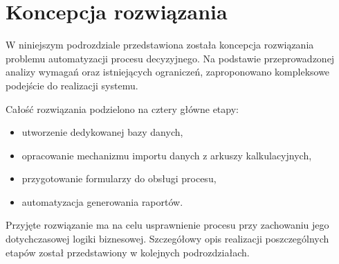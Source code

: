 \section{Koncepcja rozwiązania}
W niniejszym podrozdziale przedstawiona została koncepcja rozwiązania problemu automatyzacji procesu decyzyjnego. Na podstawie przeprowadzonej analizy wymagań oraz istniejących ograniczeń, zaproponowano kompleksowe podejście do realizacji systemu.

Całość rozwiązania podzielono na cztery główne etapy:
\begin{itemize}
    \item utworzenie dedykowanej bazy danych,
    \item opracowanie mechanizmu importu danych z arkuszy kalkulacyjnych,
    \item przygotowanie formularzy do obsługi procesu,
    \item automatyzacja generowania raportów.
\end{itemize}

Przyjęte rozwiązanie ma na celu usprawnienie procesu przy zachowaniu jego dotychczasowej logiki biznesowej. Szczegółowy opis realizacji poszczególnych etapów został przedstawiony w kolejnych podrozdziałach.